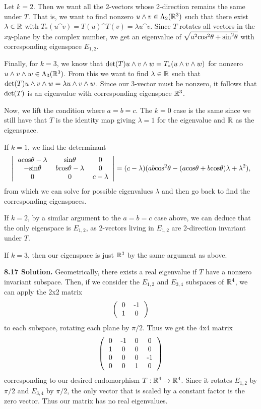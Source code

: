Let $k = 2$. Then we want all the 2-vectors whose 2-direction remains the same under $T$. That is, we want to find nonzero $u \wedge v \in \Lambda_2(\mathbb{R}^3)$ such that there exist $\lambda \in \mathbb{R}$ with $T_*(u \^ v) = T(u) \^ T(v) = \lambda u \^ v$. Since $T$ rotates all vectors in the $xy$-plane by the complex number, we get an eigenvalue of $\sqrt{a^2\text{cos}^2\theta + \text{sin}^2\theta}$ with corresponding eigenspace $E_{1,2}$.

Finally, for $k = 3$, we know that $\text{det}(T)u \wedge v \wedge w = T_*(u \wedge v \wedge w)$ for nonzero $u \wedge v \wedge w \in \Lambda_3(\mathbb{R}^3)$. From this we want to find $\lambda \in \mathbb{R}$ such that $\text{det}(T)u \wedge v \wedge w = \lambda u \wedge v \wedge w$. Since our 3-vector must be nonzero, it follows that $\text{det}(T)$ is an eigenvalue with corresponding eigenspace $\mathbb{R}^3$.

Now, we lift the condition where $a = b = c$. The $k = 0$ case is the same since we still have that $T$ is the identity map giving $\lambda = 1$ for the eigenvalue and $\mathbb{R}$ as the eigenspace.

If $k = 1$, we find the determinant
\[
\left|\begin{tabular}{ccc}
    $a\f{cos}\theta - \lambda$ & $\f{sin}\theta$ & 0 \\
    $-\f{sin}\theta$ & $b\f{cos}\theta - \lambda$ & 0 \\
    0 & 0 & $c - \lambda$
    \end{tabular}\right|
    = (c - \lambda)(ab\f{cos}^2\theta - (a\f{cos}\theta + b\f{cos}\theta)\lambda + \lambda^2),
\]
from which we can solve for possible eigenvalues $\lambda$ and then go back to find the corresponding eigenspaces.

If $k = 2$, by a similar argument to the $a = b = c$ case above, we can deduce that the only eigenspace is $E_{1, 2}$, as 2-vectors living in $E_{1, 2}$ are 2-direction invariant under $T$.

If $k = 3$, then our eigenspace is just $\mathbb{R}^3$ by the same argument as above.

\textbf{8.17 Solution.} Geometrically, there exists a real eigenvalue if $T$ have a nonzero invariant subspace. Then, if we consider the $E_{1,2}$ and $E_{3,4}$ subspaces of $\mathbb{R}^4$, we can apply the 2x2 matrix 
\[\left(
\begin{tabular}{cc}
0 & -1 \\
1 & 0
\end{tabular}
\right)\]
to each subspace, rotating each plane by $\pi/2$. Thus we get the 4x4 matrix
\[\left(
\begin{tabular}{cccc}
0 & -1 & 0 & 0 \\
1 & 0 & 0 & 0 \\
0 & 0 & 0 & -1 \\
0 & 0 & 1 & 0
\end{tabular}
\right)\]
corresponding to our desired endomorphism $T: \mathbb{R}^4 \to \mathbb{R}^4$. Since it rotates $E_{1,2}$ by $\pi/2$ and $E_{3,4}$ by $\pi/2$, the only vector that is scaled by a constant factor is the zero vector. Thus our matrix has no real eigenvalues.

